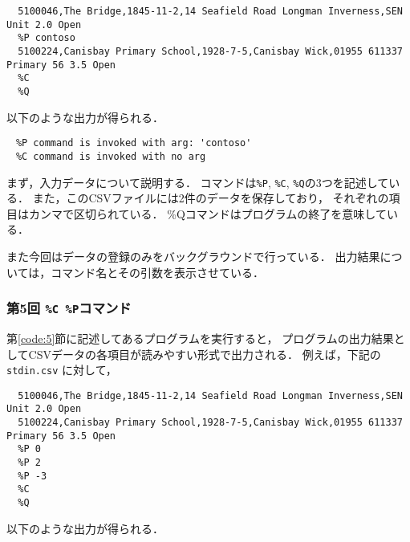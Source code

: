 \documentclass[autodetect-engine,dvi=dvipdfmx,ja=standard,
               a4j,11pt]{bxjsarticle}
\begin{document}
{\fontsize{10pt}{11pt} \selectfont
 \begin{verbatim}
  5100046,The Bridge,1845-11-2,14 Seafield Road Longman Inverness,SEN Unit 2.0 Open
  %P contoso
  5100224,Canisbay Primary School,1928-7-5,Canisbay Wick,01955 611337 Primary 56 3.5 Open
  %C
  %Q
 \end{verbatim}
}

\noindent
以下のような出力が得られる．

{\fontsize{10pt}{11pt} \selectfont
 \begin{verbatim}
　%P command is invoked with arg: 'contoso'
　%C command is invoked with no arg
 \end{verbatim}
}

まず，入力データについて説明する．
コマンドは\verb|%P|, \verb|%C|, \verb|%Q|の3つを記述している．
また，このCSVファイルには2件のデータを保存しており，
それぞれの項目はカンマで区切られている．
\%Qコマンドはプログラムの終了を意味している．

また今回はデータの登録のみをバックグラウンドで行っている．
出力結果については，コマンド名とその引数を表示させている．

\subsubsection{第5回 \texttt{\%C \%P}コマンド}

第\ref{code:5}節に記述してあるプログラムを実行すると，
プログラムの出力結果としてCSVデータの各項目が読みやすい形式で出力される．
例えば，下記の \verb|stdin.csv| に対して，

{\fontsize{10pt}{11pt} \selectfont
 \begin{verbatim}
  5100046,The Bridge,1845-11-2,14 Seafield Road Longman Inverness,SEN Unit 2.0 Open
  5100224,Canisbay Primary School,1928-7-5,Canisbay Wick,01955 611337 Primary 56 3.5 Open
  %P 0
  %P 2
  %P -3
  %C
  %Q
 \end{verbatim}
}

\noindent
以下のような出力が得られる．
\end{document}
